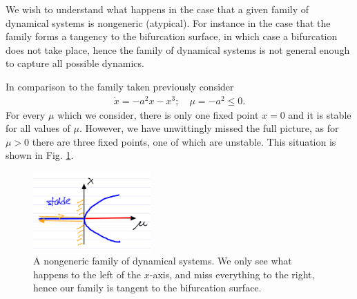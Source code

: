 We wish to understand what happens in the case that a given family of dynamical systems is nongeneric (atypical). For instance in the case that the family forms a tangency to the bifurcation surface, in which case a bifurcation does not take place, hence the family of dynamical systems is not general enough to capture all possible dynamics.

\begin{ex}
	In comparison to the family taken previously consider
	\begin{align}
		 \dot{x} = -a^2 x -x^3;\quad \mu =-a^2\leq 0.
	\end{align}
	For every $\mu $ which we consider, there is only one fixed point $x=0$ and it is stable for all values of $\mu $. However, we have unwittingly missed the full picture, as for $\mu >0$ there are three fixed points, one of which are unstable. This situation is shown in Fig. \ref{fig:nongen_ds}.
	\begin{figure}[h!]
		\centering
		\includegraphics[width=0.4\textwidth]{figures/ch3/10nongen_ds.png}
		\caption{A nongeneric family of dynamical systems. We only see what happens to the left of the $x$-axis, and miss everything to the right, hence our family is tangent to the bifurcation surface.}
		\label{fig:nongen_ds}
	\end{figure}
\end{ex}

